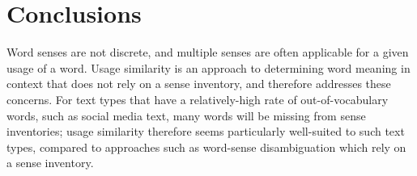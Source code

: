 \documentclass[11pt]{article}
\begin{document}




\section{Conclusions\label{sec:conclusions}}


Word senses are not discrete, and multiple senses are often applicable
for a given usage of a word. Usage similarity is an approach to
determining word meaning in context that does not rely on a sense
inventory, and therefore addresses these concerns. For text types that
have a relatively-high rate of out-of-vocabulary words, such as social
media text, many words will be missing from sense inventories; usage
similarity therefore seems particularly well-suited to such text
types, compared to approaches such as word-sense disambiguation which
rely on a sense inventory.
\end{document}

